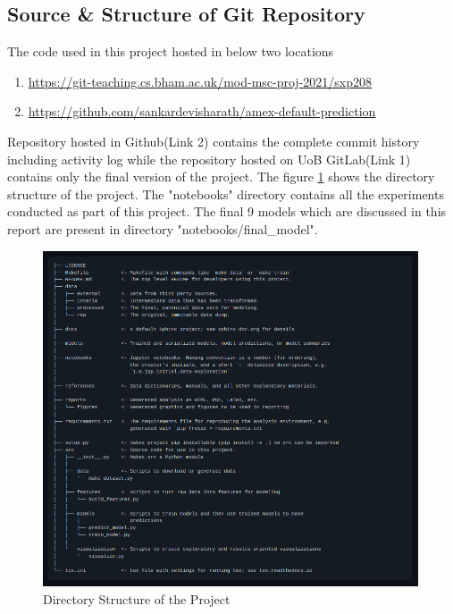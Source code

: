 \documentclass[twoside,11pt,a4paper]{article}
\begin{document}
\subsection{Source \& Structure of Git Repository}
The code used in this project hosted in below two locations
\begin{enumerate}
	\item \url{https://git-teaching.cs.bham.ac.uk/mod-msc-proj-2021/sxp208}
	\item \url{https://github.com/sankardevisharath/amex-default-prediction}
\end{enumerate}
Repository hosted in Github(Link 2) contains the complete commit history including activity log while the repository hosted on UoB GitLab(Link 1) contains only the final version of the project.
The figure \ref{fig:directory_structure} shows the directory structure of the project. The "notebooks" directory contains all the experiments conducted as part of this project. The final 9 models which are discussed in this report are present in directory "notebooks/final\_model".\\

\begin{figure}[ht]
	\centering
	\includegraphics[width=0.99\textwidth, height=0.7\textheight]{directory_structure}
	\caption[Directory Structure of the Project]{Directory Structure of the Project}
	\label{fig:directory_structure}
\end{figure} 
\FloatBarrier
\end{document}
